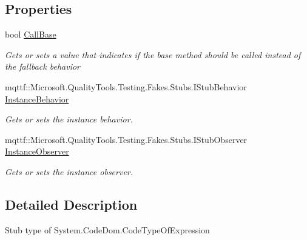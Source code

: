 \subsection*{Properties}
\begin{DoxyCompactItemize}
\item 
bool \hyperlink{class_system_1_1_code_dom_1_1_fakes_1_1_stub_code_type_of_expression_aac4027e8a11007f59c005965f4a9784e}{Call\-Base}
\begin{DoxyCompactList}\small\item\em Gets or sets a value that indicates if the base method should be called instead of the fallback behavior\end{DoxyCompactList}\item 
mqttf\-::\-Microsoft.\-Quality\-Tools.\-Testing.\-Fakes.\-Stubs.\-I\-Stub\-Behavior \hyperlink{class_system_1_1_code_dom_1_1_fakes_1_1_stub_code_type_of_expression_aa681c5bc8977352a38bc2e1e9d7ab762}{Instance\-Behavior}
\begin{DoxyCompactList}\small\item\em Gets or sets the instance behavior.\end{DoxyCompactList}\item 
mqttf\-::\-Microsoft.\-Quality\-Tools.\-Testing.\-Fakes.\-Stubs.\-I\-Stub\-Observer \hyperlink{class_system_1_1_code_dom_1_1_fakes_1_1_stub_code_type_of_expression_ab5140df188e42c1f7bfa2952846e7be2}{Instance\-Observer}
\begin{DoxyCompactList}\small\item\em Gets or sets the instance observer.\end{DoxyCompactList}\end{DoxyCompactItemize}


\subsection{Detailed Description}
Stub type of System.\-Code\-Dom.\-Code\-Type\-Of\-Expression



